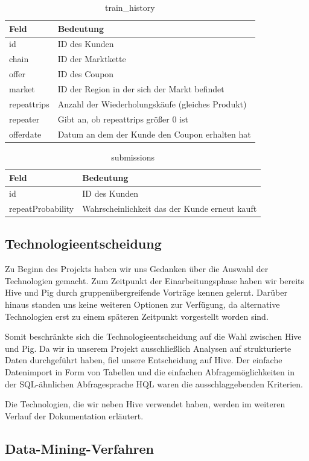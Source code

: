 \begin{table}[h]
\centering
\begin{tabular}{l|l}
	\textbf{Feld} & \textbf{Bedeutung}  \\ 
	\hline id & ID des Kunden \\ 
	\hline chain & ID der Marktkette \\ 
	\hline offer  & ID des Coupon  \\ 
	\hline market & ID der Region in der sich der Markt befindet  \\ 
	\hline repeattrips & Anzahl der Wiederholungskäufe (gleiches Produkt)  \\ 
	\hline repeater & Gibt an, ob repeattrips größer 0 ist \\ 
	\hline offerdate & Datum an dem der Kunde den Coupon erhalten hat 
	\vspace{0.3cm} \\ 
\end{tabular} 
\caption{train\_history}
\label{tab:trainhistory}
\end{table}

\begin{table}[h]
	\centering
\begin{tabular}{l|l}
	\textbf{Feld} & \textbf{Bedeutung}  \\ 
	\hline id & ID des Kunden \\ 
	\hline repeatProbability & Wahrscheinlichkeit das der Kunde erneut kauft 
	\vspace{0.3cm} \\
\end{tabular} 
\caption{submissions}
\label{tab:submissions}
\end{table}

\subsection{Technologieentscheidung}
Zu Beginn des Projekts haben wir uns Gedanken über die Auswahl der Technologien gemacht. Zum Zeitpunkt der Einarbeitungsphase haben wir bereits Hive und Pig durch gruppenübergreifende Vorträge kennen gelernt. Darüber hinaus standen uns keine weiteren Optionen zur Verfügung, da alternative Technologien erst zu einem späteren Zeitpunkt vorgestellt worden sind.

Somit beschränkte sich die Technologieentscheidung auf die Wahl zwischen Hive und Pig. Da wir in unserem Projekt ausschließlich Analysen auf strukturierte Daten durchgeführt haben, fiel unsere Entscheidung auf Hive. Der einfache Datenimport in Form von Tabellen und die einfachen Abfragemöglichkeiten in der SQL-ähnlichen Abfragesprache HQL waren die ausschlaggebenden Kriterien.

Die Technologien, die wir neben Hive verwendet haben, werden im weiteren Verlauf der Dokumentation erläutert.


\subsection{Data-Mining-Verfahren}
